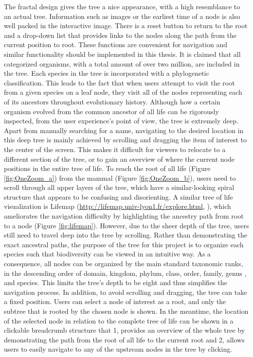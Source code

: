 \documentclass[11pt, a4paper,oneside,chapterprefix=false]{scrbook}
\begin{document}
The fractal design gives the tree a nice appearance, with a high resemblance to an actual tree. Information such as images or the earliest time of a node is also well packed in the interactive image. There is a reset button to return to the root and a drop-down list that provides links to the nodes along the path from the current position to root. These functions are convenient for navigation and similar functionality should be implemented in this thesis. It is claimed that all categorized organisms, with a total amount of over two million, are included in the tree. Each species in the tree is incorporated with a phylogenetic classification. This leads to the fact that when users attempt to visit the root from a given species on a leaf node, they visit all of the nodes representing each of its ancestors throughout evolutionary history. Although how a certain organism evolved from the common ancestor of all life can be rigorously inspected, from the user experience's point of view, the tree is extremely deep. Apart from manually searching for a name, navigating to the desired location in this deep tree is mainly achieved by scrolling and dragging the item of interest to the center of the screen. This makes it difficult for viewers to relocate to a different section of the tree, or to gain an overview of where the current node positions in the entire tree of life. To reach the root of all life (Figure \ref{fig:OneZoom_a}) from the mammal (Figure \ref{fig:OneZoom_b}), users need to scroll through all upper layers of the tree, which have a similar-looking spiral structure that appears to be confusing and disorienting. A similar tree of life visualization is Lifemap (\url{http://lifemap.univ-lyon1.fr/explore.html}, \cite{de2016lifemap}), which ameliorates the navigation difficulty by highlighting the ancestry path from root to a node (Figure \ref{fig:lifemap}). However, due to the sheer depth of the tree, users still need to travel deep into the tree by scrolling. Rather than demonstrating the exact ancestral paths, the purpose of the tree for this project is to organize each species such that biodiversity can be viewed in an intuitive way. As a consequence, all nodes can be organized by the main standard taxonomic ranks, in the descending order of domain, kingdom, phylum, class, order, family, genus , and species. This limits the tree's depth to be eight and thus simplifies the navigation process. In addition, to avoid scrolling and dragging, the tree can take a fixed position. Users can select a node of interest as a root, and only the subtree that is rooted by the chosen node is shown. In the meantime, the location of the selected node in relation to the complete tree of life can be shown in a clickable breadcrumb structure that 1, provides an overview of the whole tree by demonstrating the path from the root of all life to the current root and 2, allows users to easily navigate to any of the upstream nodes in the tree by clicking. \\
\end{document}
